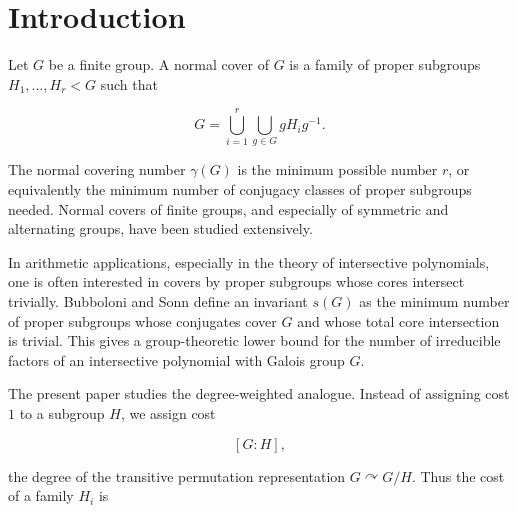 \documentclass[11pt]{article}
\begin{document}
\begin{abstract}
For $n$ odd composite, with $q=P^-(n)$ the smallest prime divisor of $n$, we prove

\[
\beta_{\mathrm{faith}}(A_n)
\sim
\frac{n!}{((n/q)!)^q q!}.
\]

For $n=p$ prime,

\[
\beta_{\mathrm{faith}}(A_p)=(1+o(1))c_p,
\]

where

\[
c_p=\min\{[A_p:H]:H<A_p,\ H\text{ contains a }p\text{-cycle}\},
\]

and

\[
\log\beta_{\mathrm{faith}}(A_p)=p\log p-p+O((\log p)^2).
\]

The proofs combine a dual certificate for weighted set cover, slack identities, elementary cycle-type arguments, comparisons among imprimitive wreath products, and standard bounds for primitive permutation groups.

\end{abstract}

\section{Introduction}

Let $G$ be a finite group. A normal cover of $G$ is a family of proper subgroups $H_1,\dots,H_r<G$ such that

\[
G=\bigcup_{i=1}^r\bigcup_{g\in G}gH_ig^{-1}.
\]

The normal covering number $\gamma(G)$ is the minimum possible number $r$, or equivalently the minimum number of conjugacy classes of proper subgroups needed. Normal covers of finite groups, and especially of symmetric and alternating groups, have been studied extensively.

In arithmetic applications, especially in the theory of intersective polynomials, one is often interested in covers by proper subgroups whose cores intersect trivially. Bubboloni and Sonn define an invariant $s(G)$ as the minimum number of proper subgroups whose conjugates cover $G$ and whose total core intersection is trivial. This gives a group-theoretic lower bound for the number of irreducible factors of an intersective polynomial with Galois group $G$.

The present paper studies the degree-weighted analogue. Instead of assigning cost $1$ to a subgroup $H$, we assign cost

\[
[G:H],
\]

the degree of the transitive permutation representation $G\curvearrowright G/H$. Thus the cost of a family $H_i$ is
\end{document}
